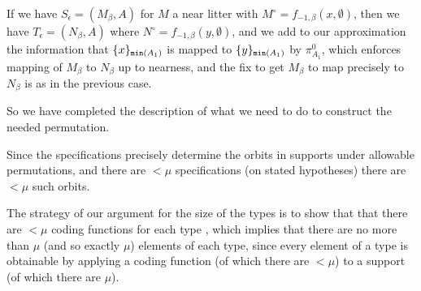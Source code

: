 \documentclass[112pt]{article}
\begin{document}
\begin{description}
If we have $S_\epsilon= (M_\beta,A)$ for $M$ a near litter with $M^\circ = f_{-1,\beta}(x,\emptyset)$, then we have $T_\epsilon=(N_\beta,A)$
where  $N^\circ = f_{-1,\beta}(y,\emptyset)$, and we add to our approximation the information that $\{x\}_{{\tt min}(A_1)}$ is mapped to 
$\{y\}_{{\tt min}(A_1)}$ by $\pi^0_{A_1}$, which enforces mapping of $M_\beta$ to $N_\beta$ up to nearness, and the fix to get $M_\beta$ to map precisely to $N_\beta$ is as in the previous case.

So we have completed the description of what we need to do to construct the needed permutation.

\end{description}

Since the specifications precisely determine the orbits in supports under allowable permutations, and there are $<\mu$ specifications
(on stated hypotheses) there are $<\mu$ such orbits.

The strategy of our argument for the size of the types is to show that that there are $<\mu$ coding functions for each type , which implies that there are no more than $\mu$ (and so exactly $\mu$) elements of each type, since every element of a type is obtainable by applying a coding function (of which there are $<\mu$) to a support (of which there are $\mu$).
\end{document}
